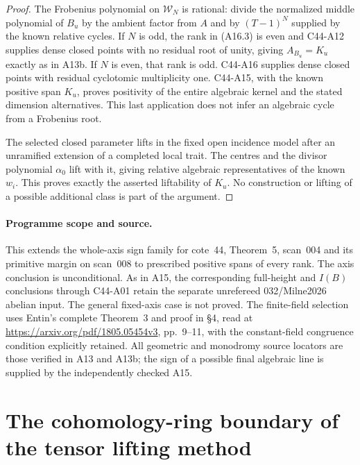 \documentclass[11pt]{article}
\theoremstyle{remark}\newtheorem{remark}[theorem]{Remark}
\begin{document}
\begin{proof}
The Frobenius polynomial on $\mathcal W_N$ is rational:
divide the normalized middle polynomial of $B_u$ by
the ambient factor from $A$ and by $(T-1)^N$ supplied
by the known relative cycles. If $N$ is odd, the rank
in (A16.3) is even and C44-A12 supplies dense closed
points with no residual root of unity, giving
$A_{B_u}=K_u$ exactly as in A13b.
If $N$ is even, that rank is odd. C44-A16 supplies
dense closed points with residual cyclotomic
multiplicity one. C44-A15, with the known positive
span $K_u$, proves positivity of the entire algebraic
kernel and the stated dimension alternatives. This
last application does not infer an algebraic cycle
from a Frobenius root.

The selected closed parameter lifts in the fixed open
incidence model after an unramified extension of a
completed local trait. The centres and the divisor
polynomial $\alpha_0$ lift with it, giving relative
algebraic representatives of the known $w_i$. This
proves exactly the asserted liftability of $K_u$.
No construction or lifting of a possible additional
class is part of the argument.
\end{proof}

\paragraph{Programme scope and source.}
This extends the whole-axis sign family for cote~44,
Theorem~5, scan~004 and its primitive margin on scan~008
to prescribed positive spans of every rank. The axis conclusion is
unconditional. As in A15, the corresponding full-height
and $I(B)$ conclusions through C44-A01 retain the separate
unrefereed 032/Milne2026 abelian input. The general fixed-axis
case is not proved. The finite-field selection uses Entin's
complete Theorem~3 and proof in \S4, read at
\url{https://arxiv.org/pdf/1805.05454v3}, pp.~9--11, with
the constant-field congruence condition explicitly retained.
All geometric and monodromy source locators are those
verified in A13 and A13b; the sign of a possible final
algebraic line is supplied by the independently checked A15.


\section{The cohomology-ring boundary of the tensor lifting method}
\end{document}
